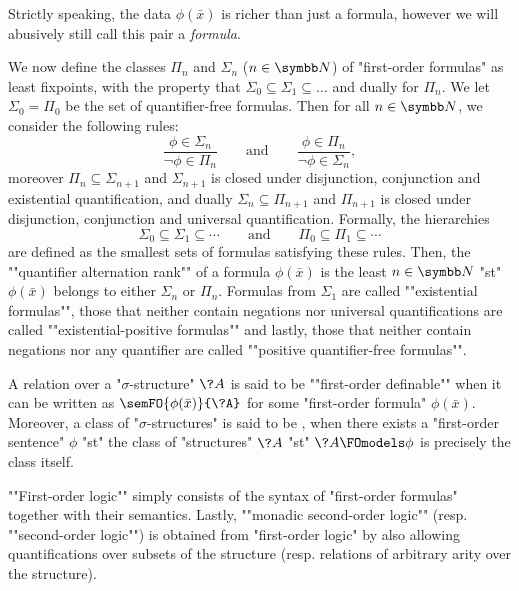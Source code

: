 \begin{remark}
	\label{rk:prelim-formula-tuple}
	Strictly speaking, the data $\phi(\bar x)$ is richer than just a
	formula, however we will abusively still call this pair a \emph{formula}.
\end{remark}

We now define the classes $\Pi_n$ and $\Sigma_n$ ($n\in\N$) of "first-order formulas"
as least fixpoints, with the property that $\Sigma_0 \subseteq \Sigma_1 \subseteq \dotsc$ and dually for $\Pi_n$.
We let $\Sigma_0 = \Pi_0$ be the set of quantifier-free formulas.
Then for all $n\in\N$, we consider the following rules:
\[
	\frac{
		\phi \in \Sigma_n
	}{
		\neg \phi \in \Pi_n
	} \qquad\text{and}\qquad
	\frac{
		\phi \in \Pi_n
	}{
		\neg \phi \in \Sigma_n
	},
\]
moreover $\Pi_n \subseteq \Sigma_{n+1}$ and $\Sigma_{n+1}$ is closed under
disjunction, conjunction and existential quantification,
and dually $\Sigma_n \subseteq \Pi_{n+1}$ and $\Pi_{n+1}$ is closed under
disjunction, conjunction and universal quantification.
Formally, the hierarchies
\[
	\Sigma_0 \subseteq \Sigma_1 \subseteq \cdots
	\qquad\text{and}\qquad
	\Pi_0 \subseteq \Pi_1 \subseteq \cdots
\]
are defined as the smallest sets of formulas satisfying these rules.
Then, the \AP""quantifier alternation rank"" of a formula $\phi(\bar x)$
is the least $n\in\N$ "st" $\phi(\bar x)$ belongs to either
$\Sigma_n$ or $\Pi_n$.
Formulas from $\Sigma_1$ are called ""existential formulas"",
those that neither contain negations nor universal quantifications are called \AP""existential-positive formulas"" and lastly, those that neither contain negations
nor any quantifier
are called ""positive quantifier-free formulas"".

A relation over a "$\sigma$-structure" $\?A$ is said to be
\AP""first-order definable"" when it can be written as
$\semFO{\phi(\bar x)}{\?A}$ for some "first-order formula" $\phi(\bar x)$.
Moreover, a class of "$\sigma$-structures" is said to be ,
when there exists a "first-order sentence" $\phi$ "st" the class of "structures" $\?A$
"st" $\?A \FOmodels \phi$ is precisely the class itself.

\AP""First-order logic"" simply consists of the syntax of "first-order formulas" together
with their semantics. Lastly, \AP""monadic second-order logic""
(resp. ""second-order logic"") is obtained from "first-order logic"
by also allowing quantifications over subsets of the structure
(resp. relations of arbitrary arity over the structure).

